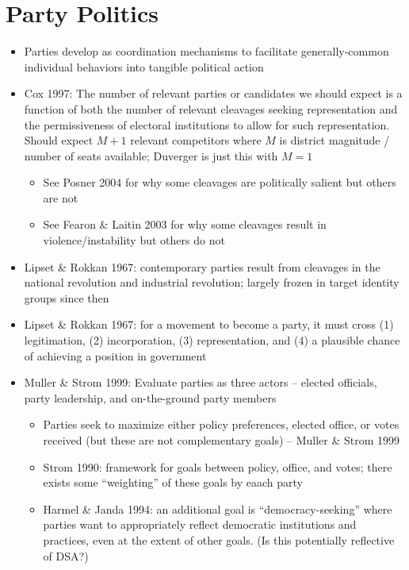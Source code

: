 \documentclass[12pt]{article}
\begin{document}
\section*{Party Politics}

\begin{itemize}
    \item Parties develop as coordination mechanisms to facilitate generally-common individual behaviors into tangible political action
    \item Cox 1997: The number of relevant parties or candidates we should expect is a function of both the number of relevant cleavages seeking representation and the permissiveness of electoral institutions to allow for such representation. Should expect $M+1$ relevant competitors where $M$ is district magnitude / number of seats available; Duverger is just this with $M=1$
    \begin{itemize}
        \item See Posner 2004 for why some cleavages are politically salient but others are not
        \item See Fearon \& Laitin 2003 for why some cleavages result in violence/instability but others do not
    \end{itemize}
    \item Lipset \& Rokkan 1967: contemporary parties result from cleavages in the national revolution and industrial revolution; largely frozen in target identity groups since then
    \item Lipset \& Rokkan 1967: for a movement to become a party, it must cross (1) legitimation, (2) incorporation, (3) representation, and (4) a plausible chance of achieving a position in government
    \item Muller \& Strom 1999: Evaluate parties as three actors -- elected officials, party leadership, and on-the-ground party members
    \begin{itemize}
        \item Parties seek to maximize either policy preferences, elected office, or votes received (but these are not complementary goals) -- Muller \& Strom 1999
        \item Strom 1990: framework for goals between policy, office, and votes; there exists some ``weighting'' of these goals by eaach party
        \item Harmel \& Janda 1994: an additional goal is ``democracy-seeking'' where parties want to appropriately reflect democratic institutions and practices, even at the extent of other goals. (Is this potentially reflective of DSA?)

\end{itemize}
\end{itemize}
\end{document}

